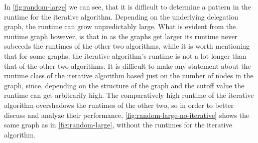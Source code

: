 In \cref{fig:random-large} we can see, that it is difficult to determine a pattern in the runtime for the iterative algorithm. Depending on the underlying delegation graph, the runtime can grow unpredictably large. What is evident from the runtime graph however, is that in as the graphs get larger its runtime never subceeds the runtimes of the other two algorithms, while it is worth mentioning that for some graphs, the iterative algorithm's runtime is not a lot longer than that of the other two algorithms. It is difficult to make any statement about the runtime class of the iterative algorithm based just on the number of nodes in the graph, since, depending on the structure of the graph and the cutoff value the runtime can get arbitrarily high. The comparatively high runtime of the iterative algorithm overshadows the runtimes of the other two, so in order to better discuss and analyze their performance, \cref{fig:random-large-no-iterative} shows the same graph as in \cref{fig:random-large}, without the runtimes for the iterative algorithm.

